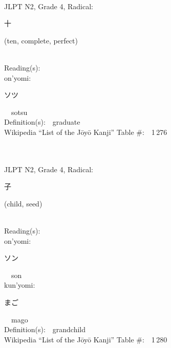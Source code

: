 \begin{multicols}{2}
{\fontsize{34pt}{40pt}  }\ \ \\  %
{JLPT N2, Grade 4, Radical:\ \ {\begin{CJK}{UTF8}{min} 十 \end{CJK}} (ten, complete, perfect) } \\
Reading(s):\ \ \\
{\hspace*{1em}}on'yomi:\ \ \\
{\hspace*{2em}}{\begin{CJK}{UTF8}{min} ソツ \end{CJK}}\ \ sotsu\ \ \\
Definition(s):\ \ graduate \\
Wikipedia ``List of the J\=oy\=o Kanji'' Table \#:\ \ 1\,276 \\
\ \ \\
{\fontsize{34pt}{40pt}  }\ \ \\  %
{JLPT N2, Grade 4, Radical:\ \ {\begin{CJK}{UTF8}{min} 子 \end{CJK}} (child, seed) } \\
Reading(s):\ \ \\
{\hspace*{1em}}on'yomi:\ \ \\
{\hspace*{2em}}{\begin{CJK}{UTF8}{min} ソン \end{CJK}}\ \ son\ \ \\
{\hspace*{1em}}kun'yomi:\ \ \\
{\hspace*{2em}}{\begin{CJK}{UTF8}{min} まご \end{CJK}}\ \ mago\ \ \\
Definition(s):\ \ grandchild \\
Wikipedia ``List of the J\=oy\=o Kanji'' Table \#:\ \ 1\,280 \\
\ \ \\
{\fontsize{34pt}{40pt}  }\ \ \\  %

\end{multicols}
